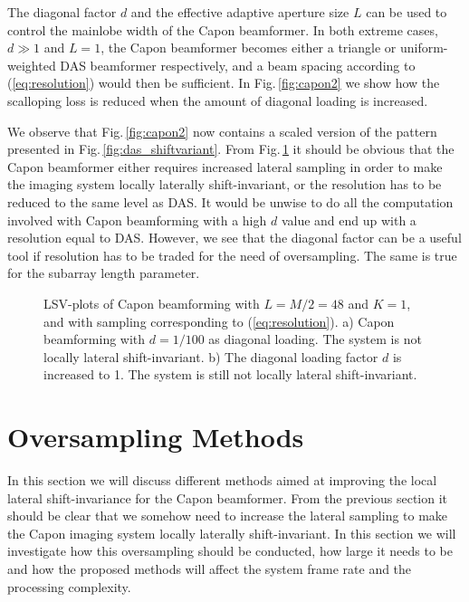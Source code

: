 \documentclass[journal]{IEEEtran}
\newcommand{\img}{img/}
\begin{document}
The diagonal factor $d$ and the effective adaptive aperture size $L$ can be used to control the mainlobe width of the Capon beamformer. In both extreme cases, $d\gg1$ and $L=1$, the Capon beamformer becomes either a triangle or uniform-weighted DAS beamformer respectively, and a beam spacing according to (\ref{eq:resolution}) would then be sufficient. In Fig.\,\ref{fig:capon2} we show how the scalloping loss is reduced when the amount of diagonal loading is increased. 

We observe that Fig.\,\ref{fig:capon2} now contains a scaled version of the pattern presented in Fig.\,\ref{fig:das_shiftvariant}. From Fig.\,\ref{fig:capon} it should be obvious that the Capon beamformer either requires increased lateral sampling in order to make the imaging system locally laterally shift-invariant, or the resolution has to be reduced to the same level as DAS. It would be unwise to do all the computation involved with Capon beamforming with a high $d$ value and end up with a resolution equal to DAS. However, we see that the diagonal factor can be a useful tool if resolution has to be traded for the need of oversampling. The same is true for the subarray length parameter.

\begin{figure}[!t]
\centerline{
}
\caption{LSV-plots of Capon beamforming with $L=M/2=48$ and $K=1$, and with sampling corresponding to (\ref{eq:resolution}). a) Capon beamforming with $d=1/100$ as diagonal loading. The system is not locally lateral shift-invariant. b) The diagonal loading factor $d$ is increased to 1. The system is still not locally lateral shift-invariant.}
\label{fig:capon}
\end{figure}

\section{Oversampling Methods}\label{sec:methods}
In this section we will discuss different methods aimed at improving the local lateral shift-invariance for the Capon beamformer. From the previous section it should be clear that we somehow need to increase the lateral sampling to make the Capon imaging system locally laterally shift-invariant. In this section we will investigate how this oversampling should be conducted, how large it needs to be and how the proposed methods will affect the system frame rate and the processing complexity.
\end{document}
